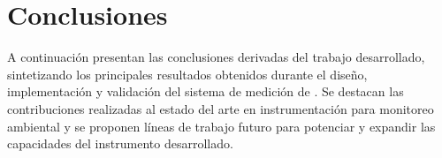 
\chapter{Conclusiones} %
%
\label{Chapter5} %
%
%
%
%
%
%
%
%
%
%


A continuación presentan las conclusiones derivadas del trabajo desarrollado, sintetizando los principales resultados obtenidos durante el diseño, implementación y validación del sistema de medición de \MPF. Se destacan las contribuciones realizadas al estado del arte en instrumentación para monitoreo ambiental y se proponen líneas de trabajo futuro para potenciar y expandir las capacidades del instrumento desarrollado.

